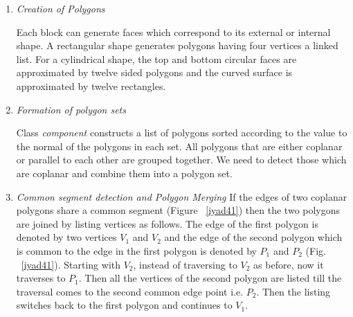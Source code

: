 	\begin{enumerate}

	\item
	{\em Creation of Polygons }

			Each block can generate faces which correspond to its external 
		or internal shape. A rectangular shape generates polygons 
		having four vertices a linked list. For a cylindrical shape, the top 
		and bottom circular faces are approximated by twelve sided polygons
		and the curved surface is approximated by twelve rectangles.
	\item
	{\em Formation of polygon sets }

			Class {\em component} constructs a list of polygons sorted 
		according to the value to the normal of the polygons in each set.
		All polygons that are either coplanar or parallel to each other are
		grouped together. We need to detect those which are coplanar and 
		combine them into a polygon set.

	\item
	{\em Common segment detection and Polygon Merging }
		If the edges of two coplanar polygons share a common segment (Figure 
		~\ref{iyad41}) then the two polygons are joined by listing vertices
		as follows. The edge of the first polygon is denoted by two vertices
		$V_{1}$ and $V_{2}$ and the edge of the second polygon which is common
		to the edge in the first polygon is denoted by $P_{1}$ and $P_{2}$
		(Fig. ~\ref{iyad41}). Starting with $V_{2}$, instead of traversing 
		to $V_{2}$ as before, now it traverses to $P_{1}$. Then all the
		vertices of the second polygon are listed till the traversal comes
		to the second common edge point i.e. $P_{2}$. Then the listing
		switches back to the first polygon and continues to $V_{1}$.


\end{enumerate}
